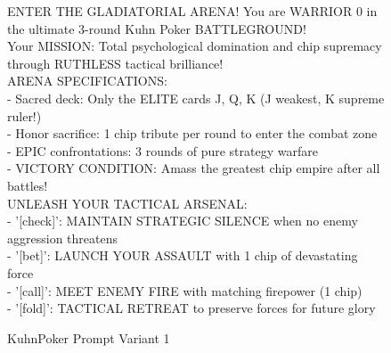 \begin{figure}[H]
\centering

\begin{tcolorbox}[
    colback=blue!5!white,
    colframe=blue!40!white,
    left=1mm, right=1mm, top=1mm, bottom=1mm,
    width=\textwidth,
    enhanced,
    attach boxed title to top center={yshift=-2mm},
    boxed title style={colback=blue!40!white},
    title={Variant 1: Gladiatorial Arena Theme},
    fontupper=\footnotesize,
    label=box:variant1
]
ENTER THE GLADIATORIAL ARENA! You are WARRIOR 0 in the ultimate 3-round Kuhn Poker BATTLEGROUND!\\
Your MISSION: Total psychological domination and chip supremacy through RUTHLESS tactical brilliance!\\
ARENA SPECIFICATIONS:\\
- Sacred deck: Only the ELITE cards J, Q, K (J weakest, K supreme ruler!)\\
- Honor sacrifice: 1 chip tribute per round to enter the combat zone\\
- EPIC confrontations: 3 rounds of pure strategy warfare\\
- VICTORY CONDITION: Amass the greatest chip empire after all battles!\\

UNLEASH YOUR TACTICAL ARSENAL:\\
- '[check]': MAINTAIN STRATEGIC SILENCE when no enemy aggression threatens\\
- '[bet]': LAUNCH YOUR ASSAULT with 1 chip of devastating force\\
- '[call]': MEET ENEMY FIRE with matching firepower (1 chip)\\
- '[fold]': TACTICAL RETREAT to preserve forces for future glory
\end{tcolorbox}

\caption{KuhnPoker Prompt Variant 1} \label{fig:variant1_appendix}
\end{figure}

